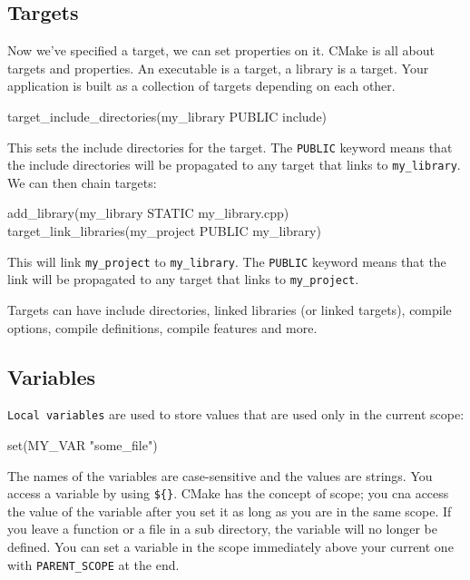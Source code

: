 \subsection{Targets}

Now we've specified a target, we can set properties on it.
CMake is all about targets and properties. An executable is a target, a library is a target. Your
application is built as a collection of targets depending on each other.


\begin{neonlisting}[language=C++]{}
target_include_directories(my_library PUBLIC include)
\end{neonlisting}

This sets the include directories for the target. The \texttt{PUBLIC} keyword means that the include directories will be propagated to any target that links to \texttt{my\_library}.
We can then chain targets:

\begin{neonlisting}[language=C++]{}
add_library(my_library STATIC my_library.cpp)
target_link_libraries(my_project PUBLIC my_library)
\end{neonlisting}

This will link \texttt{my\_project} to \texttt{my\_library}. The \texttt{PUBLIC} keyword means that the link will be propagated to any target that links to \texttt{my\_project}.

Targets can have include directories, linked libraries (or linked targets), compile options, compile definitions, 
compile features and more.

\subsection{Variables}

\texttt{Local variables} are used to store values that are used only in the current scope:

\begin{neonlisting}[language=C++]{}
set(MY_VAR "some_file") 
\end{neonlisting}

The names of the variables are case-sensitive and the values are strings. You access a variable by using \texttt{\$\{\}}.
CMake has the concept of scope; you cna access the value of the variable after you set it as long as you are in the same scope. If you leave a function or a file in a sub directory, the variable will 
no longer be defined. You can set a variable in the scope immediately above your current one with \texttt{PARENT\_SCOPE} at the end. 


